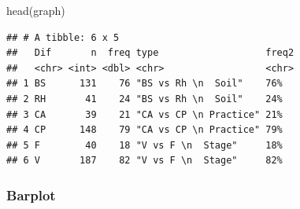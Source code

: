 \documentclass[]{interact}
\theoremstyle{plain}%
\theoremstyle{definition}
\theoremstyle{remark}
\newenvironment{Shaded}{\begin{snugshade}}{\end{snugshade}}
\newcommand{\FunctionTok}[1]{\textcolor[rgb]{0.00,0.00,0.00}{#1}}
\newcommand{\NormalTok}[1]{#1}
\begin{document}
\begin{Shaded}
\begin{Highlighting}[]
\FunctionTok{head}\NormalTok{(graph)}
\end{Highlighting}
\end{Shaded}

\begin{verbatim}
## # A tibble: 6 x 5
##   Dif       n  freq type                   freq2
##   <chr> <int> <dbl> <chr>                  <chr>
## 1 BS      131    76 "BS vs Rh \n  Soil"    76%  
## 2 RH       41    24 "BS vs Rh \n  Soil"    24%  
## 3 CA       39    21 "CA vs CP \n Practice" 21%  
## 4 CP      148    79 "CA vs CP \n Practice" 79%  
## 5 F        40    18 "V vs F \n  Stage"     18%  
## 6 V       187    82 "V vs F \n  Stage"     82%
\end{verbatim}

\hypertarget{barplot}{%
\subsubsection{Barplot}\label{barplot}}
\end{document}
